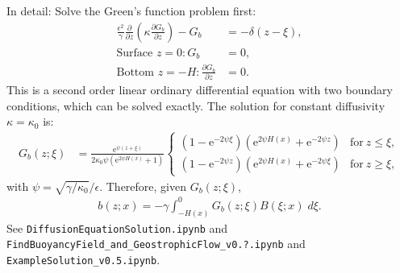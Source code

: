 \documentclass[10pt]{amsart}
\begin{document}
In detail: Solve the Green's function problem first:
\begin{align}
\frac{\epsilon^2}{\gamma} \frac{\partial }{\partial z} \left( \kappa \frac{\partial G_b}{\partial z} \right) -  G_b & =  -  \delta(z - \xi) , \label{eqn:Gsfn}\\
\text{Surface~}z = 0:
G_b &= 0 ,
\label{eqn:Gsfn_sfcbc} \\
\text{Bottom~}z = -H:
\frac{\partial G_b}{\partial z} &= 0 .
\label{eqn:Gsfn_botbc}
\end{align}
This is a second order linear ordinary differential equation with two boundary conditions, which can be solved exactly.
The solution for constant diffusivity $\kappa = \kappa_0$ is:
\begin{align}
G_b (z; \xi) & = \frac{\mathrm{e}^{\psi \left(z + \xi\right)}}
{2  \kappa_0 \psi \left(\mathrm{e}^{2 \psi H \left(x \right)} + 1\right)}
\begin{cases} 
\displaystyle \left(1 - \mathrm{e}^{- 2 \psi \xi} \right) \left(\mathrm{e}^{2 \psi H{\left(x \right)}} + \mathrm{e}^{- 2 \psi z  }\right) & \text{for}\: z \leq \xi , \\
\displaystyle \left(1 - \mathrm{e}^{- 2 \psi   z} \right) \left(\mathrm{e}^{2 \psi H{\left(x \right)}} + \mathrm{e}^{- 2 \psi \xi}\right) & \text{for}\: z \geq \xi ,
\end{cases}
\end{align}
with $\psi = \sqrt{\gamma/\kappa_0} / \epsilon$.
Therefore, given $G_b(z; \xi)$,
\begin{align}
b(z; x) = - \gamma \int_{-H(x)}^{0} G_b(z; \xi) B(\xi; x) \; d \xi  .
\label{eqn:b_solution}
\end{align}
See \texttt{DiffusionEquationSolution.ipynb} and \texttt{FindBuoyancyField\_and\_GeostrophicFlow\_v0.?.ipynb} and \texttt{ExampleSolution\_v0.5.ipynb}.
\end{document}
